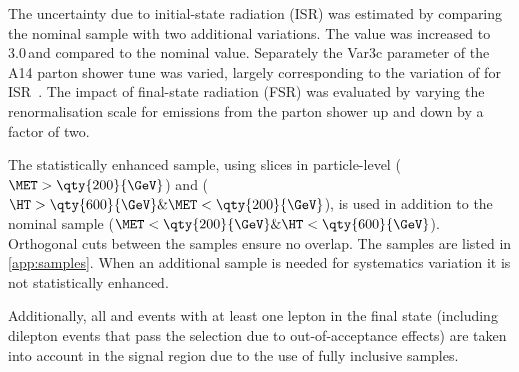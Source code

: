 The uncertainty due to initial-state radiation (ISR) was estimated by
comparing the nominal \ttbar sample with two additional
variations. The \hdamp value was increased to 3.0\,\mtop and compared to the
nominal value. Separately the Var3c parameter of the A14 parton shower tune was varied,
largely corresponding to the variation of \alphas for ISR~\cite{ATL-PHYS-PUB-2014-021}.
The impact of final-state radiation (FSR) was evaluated by
varying the renormalisation scale for emissions from the
parton shower up and down by a factor of two.

The statistically enhanced \ttbar sample, using slices in particle-level 
 \MET (\( \MET > \qty{200}{\GeV} \)) and \HT
(\( \HT > \qty{600}{\GeV} \& \MET < \qty{200}{\GeV} \)), is used in addition
to the nominal sample (\(\MET < \qty{200}{\GeV} \& \HT < \qty{600}{\GeV}\)).
Orthogonal cuts between the samples ensure no overlap.
The samples are listed in \cref{app:samples}. When an additional sample is needed
for systematics variation it is not statistically enhanced.

Additionally, all \ttbar and \tW events with at least one lepton in the final state (including dilepton events that pass the selection due to out-of-acceptance effects) are taken into account in the signal
region due to the use of fully inclusive \ttbar samples.

